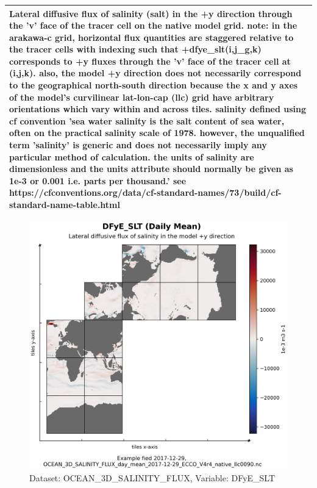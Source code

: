 \begin{longtable}{|m{}|m{}|m{}|m{}|}
\multicolumn{4}{|p{1\textwidth}|}{Lateral diffusive flux of salinity (salt) in the +y direction through the 'v' face of the tracer cell on the native model grid. note: in the arakawa-c grid, horizontal flux quantities are staggered relative to the tracer cells with indexing such that +dfye\_slt(i,j\_g,k) corresponds to +y fluxes through the 'v' face of the tracer cell at (i,j,k). also, the model +y direction does not necessarily correspond to the geographical north-south direction because the x and y axes of the model's curvilinear lat-lon-cap (llc) grid have arbitrary orientations which vary within and across tiles. salinity defined using cf convention 'sea water salinity is the salt content of sea water, often on the practical salinity scale of 1978. however, the unqualified term 'salinity' is generic and does not necessarily imply any particular method of calculation. the units of salinity are dimensionless and the units attribute should normally be given as 1e-3 or 0.001 i.e. parts per thousand.' see https://cfconventions.org/data/cf-standard-names/73/build/cf-standard-name-table.html} \\ \hline
\end{longtable}

\begin{figure}[H]
\centering
\includegraphics[scale=0.55]{../images/plots/native_plots/Ocean_Three-Dimensional_Salinity_Fluxes/DFyE_SLT.png}
\caption{Dataset: OCEAN\_3D\_SALINITY\_FLUX, Variable: DFyE\_SLT}
\label{tab:table-OCEAN_3D_SALINITY_FLUX_DFyE_SLT-Plot}
\end{figure}
\pagebreak
